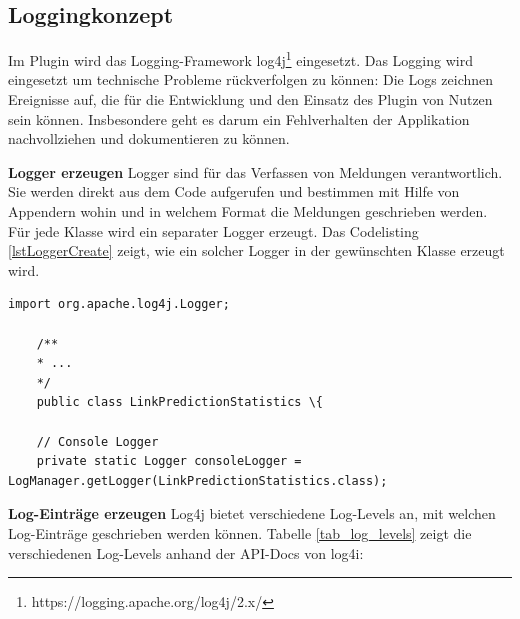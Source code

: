 \subsection{Loggingkonzept}
\label{loggingkonzept}

Im Plugin wird das Logging-Framework log4j\footnote{https://logging.apache.org/log4j/2.x/} eingesetzt.
Das Logging wird eingesetzt um technische Probleme rückverfolgen zu können: Die Logs zeichnen Ereignisse auf, die für die Entwicklung und den Einsatz des Plugin von Nutzen sein können.
Insbesondere geht es darum ein Fehlverhalten der Applikation nachvollziehen und dokumentieren zu können.

\textbf{Logger erzeugen}
Logger sind für das Verfassen von Meldungen verantwortlich. Sie werden direkt aus dem Code aufgerufen und bestimmen mit Hilfe von Appendern wohin und in welchem Format die Meldungen geschrieben werden.
Für jede Klasse wird ein separater Logger erzeugt. Das Codelisting \ref{lstLoggerCreate} zeigt, wie ein solcher Logger in der gewünschten Klasse erzeugt wird.

\begin{lstlisting}[caption={Erzeugen eines Loggers},label=lstLoggerCreate]
    import org.apache.log4j.Logger;

    /**
    * ...
    */
    public class LinkPredictionStatistics \{

    // Console Logger
    private static Logger consoleLogger = LogManager.getLogger(LinkPredictionStatistics.class);
\end{lstlisting}

\textbf{Log-Einträge erzeugen}
Log4j bietet verschiedene Log-Levels an, mit welchen Log-Einträge geschrieben werden können.
Tabelle \ref{tab_log_levels} zeigt die verschiedenen Log-Levels anhand der \acs{API}-Docs von log4i:

